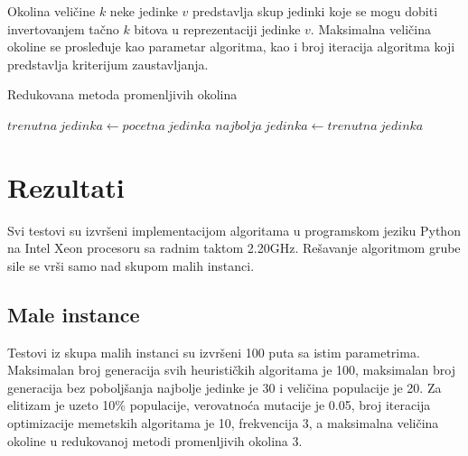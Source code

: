 \documentclass[12pt, a4paper]{article}
\theoremstyle{definition}
\begin{document}
Okolina veličine $k$ neke jedinke $v$ predstavlja skup jedinki koje se mogu dobiti invertovanjem tačno $k$ bitova u reprezentaciji jedinke $v$. Maksimalna veličina okoline se prosleđuje kao parametar algoritma, kao i broj iteracija algoritma koji predstavlja kriterijum zaustavljanja.

\vspace{5mm}

\begin{algorithm}[H]
\caption{Redukovana metoda promenljivih okolina}
\label{alg:5}
$trenutna\ jedinka \gets pocetna\ jedinka$\;
$najbolja\ jedinka \gets trenutna\ jedinka$\;
\end{algorithm}

\section{Rezultati}

Svi testovi su izvršeni implementacijom algoritama u programskom jeziku Python na Intel Xeon procesoru sa radnim taktom 2.20GHz. Rešavanje algoritmom grube sile se vrši samo nad skupom malih instanci.

\subsection{Male instance}

Testovi iz skupa malih instanci su izvršeni 100 puta sa istim parametrima. Maksimalan broj generacija svih heurističkih algoritama je 100, maksimalan broj generacija bez poboljšanja najbolje jedinke je 30 i veličina populacije je 20. Za elitizam je uzeto 10\% populacije, verovatnoća mutacije je 0.05, broj iteracija optimizacije memetskih algoritama je 10, frekvencija 3, a maksimalna veličina okoline u redukovanoj metodi promenljivih okolina 3.
\end{document}
